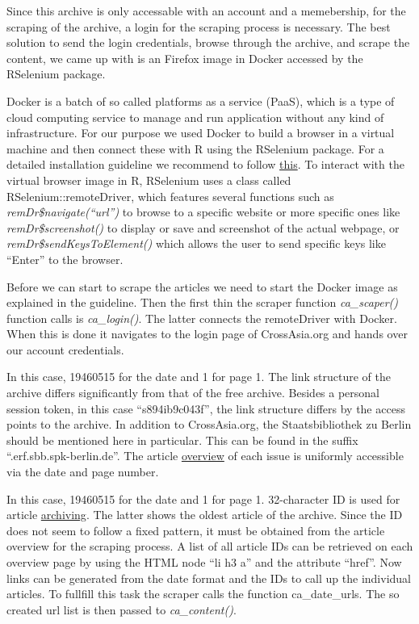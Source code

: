 \documentclass[12pt,a4paper]{article}
\begin{document}
Since this archive is only accessable with an account and a memebership, for the scraping of the archive, a login for the scraping process is necessary. The best solution to send the login credentials, browse through the archive, and scrape the content, we came up with is an Firefox image in Docker accessed by the RSelenium package.

Docker is a batch of so called platforms as a service (PaaS), which is a type of cloud computing service to manage and run application without any kind of infrastructure. For our purpose we used Docker to build a browser in a virtual machine and then connect these with R using the RSelenium package. For a detailed installation guideline we recommend to follow \href{https://docs.ropensci.org/RSelenium/articles/docker.html}{this}. To interact with the virtual browser image in R, RSelenium uses a class called RSelenium::remoteDriver, which features several functions such as \emph{remDr\$navigate(``url'')} to browse to a specific website or more specific ones like \emph{remDr\$screenshot()} to display or save and screenshot of the actual webpage, or \emph{remDr\$sendKeysToElement()} which allows the user to send specific keys like ``Enter'' to the browser.

Before we can start to scrape the articles we need to start the Docker image as explained in the guideline. Then the first thin the scraper function \emph{ca\_scaper()} function calls is \emph{ca\_login()}. The latter connects the remoteDriver with Docker. When this is done it navigates to the login page of CrossAsia.org and hands over our account credentials.

In this case, 19460515 for the date and 1 for page 1. The link structure of the archive differs significantly from that of the free archive. Besides a personal session token, in this case ``s894ib9c043f'', the link structure differs by the access points to the archive. In addition to CrossAsia.org, the Staatsbibliothek zu Berlin should be mentioned here in particular. This can be found in the suffix ``.erf.sbb.spk-berlin.de''. The article \href{http://data.people.com.cn.s894ib9c043f.erf.sbb.spk-berlin.de/rmrb/19460515/1/}{overview} of each issue is uniformly accessible via the date and page number.

In this case, 19460515 for the date and 1 for page 1. 32-character ID is used for article \href{http://data.people.com.cn.s894ib9c043f.erf.sbb.spk-berlin.de/rmrb/19460515/1/cae1d1ef94a74c8e99ad43189652fb40}{archiving}. The latter shows the oldest article of the archive. Since the ID does not seem to follow a fixed pattern, it must be obtained from the article overview for the scraping process. A list of all article IDs can be retrieved on each overview page by using the HTML node ``li h3 a'' and the attribute ``href''. Now links can be generated from the date format and the IDs to call up the individual articles. To fullfill this task the scraper calls the function ca\_date\_urls. The so created url list is then passed to \emph{ca\_content()}.
\end{document}
